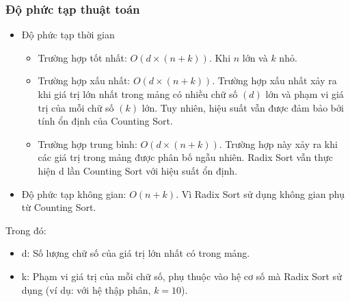 \begin{center}
\end{center}

\subsubsection{Độ phức tạp thuật toán}

\begin{itemize}
    \item Độ phức tạp thời gian
    \begin{itemize}[label=$\circ$]
        \item Trường hợp tốt nhất: $O\left(d\times\left(n+k\right)\right)$. 
        Khi $n$ lớn và $k$ nhỏ. 
        \item Trường hợp xấu nhất: $O\left(d\times\left(n+k\right)\right)$. 
        Trường hợp xấu nhất xảy ra khi giá trị lớn nhất trong mảng có nhiều 
        chữ số $(d)$ lớn và phạm vi giá trị của mỗi chữ số $(k)$ lớn. Tuy nhiên, 
        hiệu suất vẫn được đảm bảo bởi tính ổn định của Counting Sort.
        \item Trường hợp trung bình: $O\left(d\times\left(n+k\right)\right)$. 
        Trường hợp này xảy ra khi các giá trị trong mảng được phân bố ngẫu nhiên. 
        Radix Sort vẫn thực hiện d lần Counting Sort với hiệu suất ổn định.
    \end{itemize}
    
    \item Độ phức tạp không gian: $O\left(n+k\right)$. Vì Radix Sort 
    sử dụng không gian phụ từ Counting Sort.

\end{itemize}

Trong đó:

\begin{itemize}[label=$\circ$]
    \item d: Số lượng chữ số của giá trị lớn nhất có trong mảng.
    \item k: Phạm vi giá trị của mỗi chữ số, phụ thuộc vào hệ cơ số 
    mà Radix Sort sử dụng (ví dụ: với hệ thập phân, $k=10$).
\end{itemize}